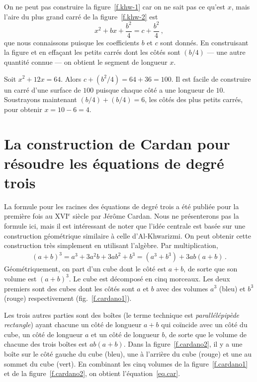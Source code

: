 On ne peut pas construire  la figure~\ref{f.khw-1} car on ne sait pas ce qu'est $x$, mais l'aire du plus grand carré de la figure~\ref{f.khw-2} est 
\[
x^2+bx+\frac{b^2}{4}=c+\frac{b^2}{4}\,,
\]
que nous connaissons puisque les coefficients $b$ et $c$  sont donnés. En construisant la figure  et en effaçant les petits carrés dont les côtés sont $(b/4)$ --- une autre quantité connue --- on obtient le segment  de longueur $x$.

\begin{example}
Soit $x^2+12x=64$. Alors $c+(b^2/4)=64+36=100$. Il est facile de construire un carré d'une surface de $100$ puisque chaque côté a une longueur de $10$. Soustrayons maintenant $(b/4)+(b/4)=6$, les côtés des plus petits carrés, pour obtenir $x=10-6=4$.
\end{example}

\section{La construction de Cardan  pour résoudre les équations de degré trois}\label{s.cardano}

La formule pour les racines des équations de degré trois a été publiée pour la première fois au XVI$^\text{e}$ siècle par Jérôme Cardan. Nous ne présenterons pas la formule ici, mais il est intéressant de noter que l'idée centrale est basée sur une construction géométrique similaire à celle d'Al-Khwarizmi. On peut obtenir cette construction très simplement en utilisant l'algèbre. Par multiplication,
\begin{align}\label{eq.car}
(a+b)^3=a^3+3a^2b+3ab^2+b^3=(a^3+b^3)+3ab(a+b)\,.
\end{align}
Géométriquement, on part d'un cube dont le côté est $a+b$, de sorte que son volume est $(a+b)^3$. Le cube est décomposé en cinq morceaux. Les deux premiers sont des cubes dont les côtés sont $a$ et $b$ avec des volumes $a^3$ (bleu) et $b^3$ (rouge)  respectivement (fig.~\ref{f.cardano1}).

Les trois autres parties sont des boîtes (le terme technique est \emph{parallélépipède  rectangle}) ayant chacune un côté de longueur $a+b$ qui coïncide avec un côté du cube, un côté de longueur $a$ et un côté de longueur $b$, de sorte que le volume de chacune des trois boîtes est $ab(a+b)$. Dans la figure~\ref{f.cardano2}, il y a une boîte sur le côté gauche du cube (bleu), une à l'arrière du cube (rouge) et une au sommet du cube (vert).
En combinant les cinq volumes de la figure~\ref{f.cardano1} et de la figure~\ref{f.cardano2}, on obtient l'équation~\ref{eq.car}.


